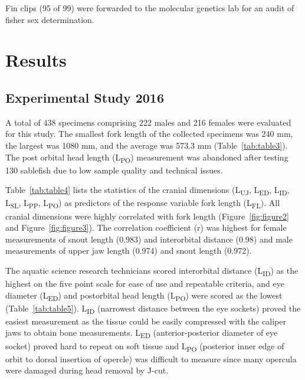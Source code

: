 \documentclass[12pt]{article}\usepackage[]{graphicx}\usepackage[]{color}
\begin{document}
Fin clips (95 of 99) were forwarded to the molecular genetics lab for an audit of fisher sex determination.

\hypertarget{results}{%
\section{Results}\label{results}}

\hypertarget{experimental-study-2016-1}{%
\subsection{Experimental Study 2016}\label{experimental-study-2016-1}}

A total of 438 specimens comprising 222 males and 216 females were evaluated for this study. The smallest fork length of the collected specimens was 240 mm, the largest was 1080 mm, and the average was 573.3 mm (Table~\ref{tab:table3}). The post orbital head length (L\textsubscript{PO}) measurement was abandoned after testing 130 sablefish due to low sample quality and technical issues.

Table~\ref{tab:table4} lists the statistics of the cranial dimensions (L\textsubscript{UJ}, L\textsubscript{ED}, L\textsubscript{ID}, L\textsubscript{SL}, L\textsubscript{PP}, L\textsubscript{PO}) as predictors of the response variable fork length (L\textsubscript{FL}). All cranial dimensions were highly correlated with fork length (Figure~\ref{fig:figure2} and Figure~\ref{fig:figure3}). The correlation coefficient (r) was highest for female measurements of snout length (0.983) and interorbital distance (0.98) and male measurements of upper jaw length (0.974) and snout length (0.972).

The aquatic science research technicians scored interorbital distance (L\textsubscript{ID}) as the highest on the five point scale for ease of use and repeatable criteria, and eye diameter (L\textsubscript{ED}) and postorbital head length (L\textsubscript{PO}) were scored as the lowest (Table~\ref{tab:table5}). L\textsubscript{ID} (narrowest distance between the eye sockets) proved the easiest measurement as the tissue could be easily compressed with the caliper jaws to obtain bone measurements. L\textsubscript{ED} (anterior-posterior diameter of eye socket) proved hard to repeat on soft tissue and L\textsubscript{PO} (posterior inner edge of orbit to dorsal insertion of opercle) was difficult to measure since many opercula were damaged during head removal by J-cut.
\end{document}
